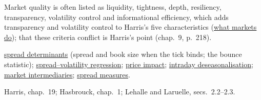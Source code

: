 \begin{qfdefinition}
Market quality is often listed as liquidity, tightness, depth, resiliency, transparency, volatility control and informational efficiency, which adds transparency and volatility control to Harris's five characteristics (\hyperref[def:market-functions]{what markets do}); that these criteria conflict is Harris's point (chap.~9, p.~218).

 \hyperref[res:spread-determinants]{spread determinants} (spread and book size when the tick binds; the bounce statistic); \hyperref[meth:spread-volatility-regression]{spread--volatility regression}; \hyperref[def:price-impact]{price impact}; \hyperref[meth:intraday-deseasonalisation]{intraday deseasonalisation}; \hyperref[def:market-intermediaries]{market intermediaries}; \hyperref[def:spread-measures]{spread measures}.

 Harris, chap.~19; Hasbrouck, chap.~1; Lehalle and Laruelle, secs.~2.2--2.3.

\end{qfdefinition}
